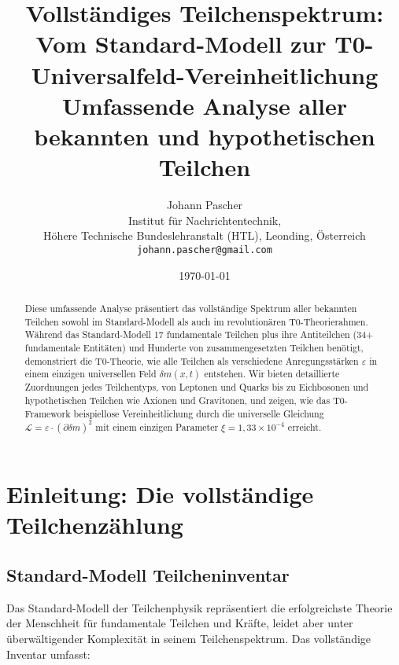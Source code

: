 \documentclass[12pt,a4paper]{article}
\newcommand{\deltam}{\delta m}
\newcommand{\xipar}{\xi}
\newcommand{\Lag}{\mathcal{L}}
\begin{document}
	
	\title{Vollständiges Teilchenspektrum: \\
		Vom Standard-Modell zur T0-Universalfeld-Vereinheitlichung \\
		\large Umfassende Analyse aller bekannten und hypothetischen Teilchen}
	\author{Johann Pascher\\
		Institut für Nachrichtentechnik, \\Höhere Technische Bundeslehranstalt (HTL), Leonding, Österreich\\
		\texttt{johann.pascher@gmail.com}}
	\date{\today}
	
	\maketitle
	
	\begin{abstract}
		Diese umfassende Analyse präsentiert das vollständige Spektrum aller bekannten Teilchen sowohl im Standard-Modell als auch im revolutionären T0-Theorierahmen. Während das Standard-Modell 17 fundamentale Teilchen plus ihre Antiteilchen (34+ fundamentale Entitäten) und Hunderte von zusammengesetzten Teilchen benötigt, demonstriert die T0-Theorie, wie alle Teilchen als verschiedene Anregungsstärken $\varepsilon$ in einem einzigen universellen Feld $\deltam(x,t)$ entstehen. Wir bieten detaillierte Zuordnungen jedes Teilchentyps, von Leptonen und Quarks bis zu Eichbosonen und hypothetischen Teilchen wie Axionen und Gravitonen, und zeigen, wie das T0-Framework beispiellose Vereinheitlichung durch die universelle Gleichung $\Lag = \varepsilon \cdot (\partial \deltam)^2$ mit einem einzigen Parameter $\xipar = 1{,}33 \times 10^{-4}$ erreicht.
	\end{abstract}
	
	\tableofcontents
	\newpage
	
	\section{Einleitung: Die vollständige Teilchenzählung}
	
	\subsection{Standard-Modell Teilcheninventar}
	
	Das Standard-Modell der Teilchenphysik repräsentiert die erfolgreichste Theorie der Menschheit für fundamentale Teilchen und Kräfte, leidet aber unter überwältigender Komplexität in seinem Teilchenspektrum. Das vollständige Inventar umfasst:
	
\end{document}
